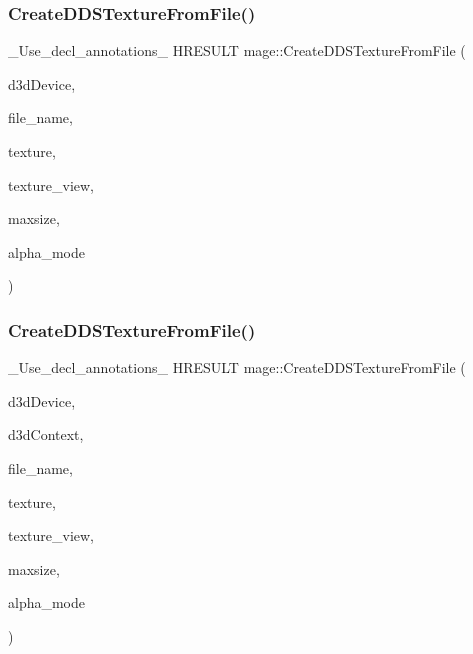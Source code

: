 \hypertarget{namespacemage_abb3d998e8e64bab729050e5d6b9e848c}{}\label{namespacemage_abb3d998e8e64bab729050e5d6b9e848c} 
\subsubsection{\texorpdfstring{Create\+D\+D\+S\+Texture\+From\+File()}{CreateDDSTextureFromFile()}\hspace{0.1cm}{\footnotesize\ttfamily [3/4]}}
{\footnotesize\ttfamily \+\_\+\+Use\+\_\+decl\+\_\+annotations\+\_\+ H\+R\+E\+S\+U\+LT mage\+::\+Create\+D\+D\+S\+Texture\+From\+File (\begin{DoxyParamCaption}\item[{I\+D3\+D11\+Device $\ast$}]{d3d\+Device,  }\item[{const wchar\+\_\+t $\ast$}]{file\+\_\+name,  }\item[{I\+D3\+D11\+Resource $\ast$$\ast$}]{texture,  }\item[{I\+D3\+D11\+Shader\+Resource\+View $\ast$$\ast$}]{texture\+\_\+view,  }\item[{size\+\_\+t}]{maxsize,  }\item[{\hyperlink{namespacemage_a0c586a2bad862f4858900ca121ca80c2}{D\+D\+S\+\_\+\+A\+L\+P\+H\+A\+\_\+\+M\+O\+DE} $\ast$}]{alpha\+\_\+mode }\end{DoxyParamCaption})}

\hypertarget{namespacemage_ae4d1a462c004d260ef861c9ccdcba9e3}{}\label{namespacemage_ae4d1a462c004d260ef861c9ccdcba9e3} 
\subsubsection{\texorpdfstring{Create\+D\+D\+S\+Texture\+From\+File()}{CreateDDSTextureFromFile()}\hspace{0.1cm}{\footnotesize\ttfamily [4/4]}}
{\footnotesize\ttfamily \+\_\+\+Use\+\_\+decl\+\_\+annotations\+\_\+ H\+R\+E\+S\+U\+LT mage\+::\+Create\+D\+D\+S\+Texture\+From\+File (\begin{DoxyParamCaption}\item[{I\+D3\+D11\+Device $\ast$}]{d3d\+Device,  }\item[{I\+D3\+D11\+Device\+Context $\ast$}]{d3d\+Context,  }\item[{const wchar\+\_\+t $\ast$}]{file\+\_\+name,  }\item[{I\+D3\+D11\+Resource $\ast$$\ast$}]{texture,  }\item[{I\+D3\+D11\+Shader\+Resource\+View $\ast$$\ast$}]{texture\+\_\+view,  }\item[{size\+\_\+t}]{maxsize,  }\item[{\hyperlink{namespacemage_a0c586a2bad862f4858900ca121ca80c2}{D\+D\+S\+\_\+\+A\+L\+P\+H\+A\+\_\+\+M\+O\+DE} $\ast$}]{alpha\+\_\+mode }\end{DoxyParamCaption})}

